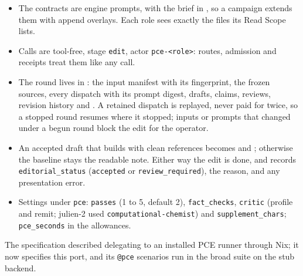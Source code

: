 \documentclass[11pt,a4paper]{article}
\begin{document}
\begin{itemize}[nosep]
\item The contracts are engine prompts,  with the brief in
  , so a campaign extends them with append overlays. Each role sees exactly
  the files its Read Scope lists.
\item Calls are tool-free, stage \texttt{edit}, actor \texttt{pce-<role>}: routes, admission
  and receipts treat them like any call.
\item The round lives in : the input manifest with its fingerprint, the
  frozen sources, every dispatch with its prompt digest, drafts, claims, reviews, revision
  history and . A retained dispatch is replayed, never paid for twice, so a
  stopped round resumes where it stopped; inputs or prompts that changed under a begun round
  block the edit for the operator.
\item An accepted draft that builds with clean references becomes  and
  ; otherwise the baseline stays the readable note. Either way the edit is
  done, and  records \texttt{editorial\_status} (\texttt{accepted} or
  \texttt{review\_required}), the reason, and any presentation error.
\item Settings under \texttt{pce}: \texttt{passes} (1 to 5, default 2),
  \texttt{fact\_checks}, \texttt{critic} (profile and remit; julien-2 used
  \texttt{computational-chemist}) and \texttt{supplement\_chars}; \texttt{pce\_seconds} in
  the allowances.
\end{itemize}

The specification  described delegating to an
installed PCE runner through Nix; it now specifies this port, and its \texttt{@pce} scenarios
run in the broad suite on the stub backend.
\end{document}
